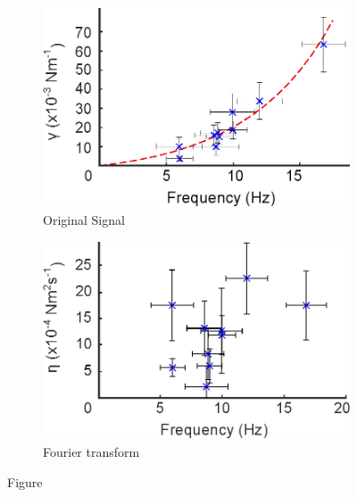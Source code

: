 \documentclass{physics_article_B}
\begin{document}
        \begin{figure}[H]
            \centering   
            \begin{subfigure}[b]{0.48\textwidth}
                \hspace*{0cm}\includegraphics[width=\textwidth]{Figures/f_vs_gamma.eps}
                \caption{Original Signal}
                \label{fig:vsgamma:f}
            \end{subfigure}\hspace{3pt}
            \begin{subfigure}[b]{0.48\textwidth}
                \hspace*{0.1cm}\includegraphics[width=\textwidth]{Figures/f_vs_eta.eps} 
                \caption{Fourier transform}
                \label{fig:vseta:f}
                \end{subfigure}
            \caption{Figure }\label{fig:vseta}
        \end{figure} 
        
\end{document}
